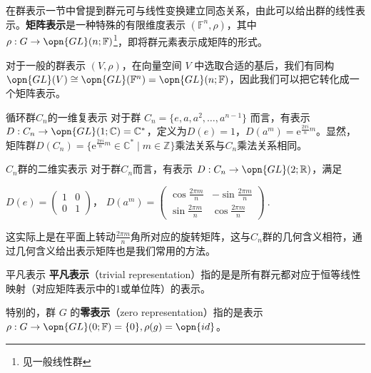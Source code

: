

在群表示一节中曾提到群元可与线性变换建立同态关系，由此可以给出群的线性表示。\textbf{矩阵表示}是一种特殊的有限维度表示 $(\mathbb{F}^n, \rho)$，其中 $\rho: G \to \opn{GL}(n; \mathbb{F})$\footnote{见一般线性群}，即将群元素表示成矩阵的形式。

对于一般的群表示 $(V, \rho)$，在向量空间 $V$ 中选取合适的基后，我们有同构 $\opn{GL}(V) \cong \opn{GL}(\mathbb{F}^n) = \opn{GL}(n; \mathbb{F})$，因此我们可以把它转化成一个矩阵表示。

\begin{example}{循环群$C_n$的一维复表示}\label{ex_gprep_1}
对于群 $C_n = \{e, a, a^2, \dots, a^{n - 1}\}$ 而言，有表示 $D: C_n \to \opn{GL}(1; \mathbb{C}) = \mathbb{C}^*$，定义为$D(e)=1$，$D(a^m) = \mathrm{e}^{\frac{2\pi i}{n}m}$。显然，矩阵群$D(C_n) = \{\mathrm{e}^{\frac{2\pi i}{n}m} \in \mathbb{C}^* \mid m \in \mathbb{Z}\}$乘法关系与$C_n$乘法关系相同。
\end{example}

\begin{example}{$C_n$群的二维实表示}\label{ex_gprep_2}
对于群$C_n$而言，有表示 $D: C_n \to \opn{GL}(2; \mathbb{R})$，满足

$D(e)=\begin{pmatrix}
 1 & 0 \\
 0 & 1
\end{pmatrix}$，
$D(a^m)=\begin{pmatrix}
 \cos{\frac{2\pi m}{n}} & -\sin{\frac{2\pi m}{n}}\\
 \sin{\frac{2\pi m}{n}} &\cos{\frac{2\pi m}{n}}
\end{pmatrix}~.$

这实际上是在平面上转动$\frac{2\pi m}{n}$角所对应的旋转矩阵，这与$C_n$群的几何含义相符，通过几何含义给出表示矩阵也是我们常用的方法。
\end{example}

\begin{definition}{平凡表示}
\textbf{平凡表示}（trivial representation）指的是是所有群元都对应于恒等线性映射（对应矩阵表示中的1或单位阵）的表示。

特别的，群 $G$ 的\textbf{零表示}（zero representation）指的是表示 $\rho: G \to \opn{GL}(0; \mathbb{F}) = \{0\}, \rho(g) = \opn{id}$。
\end{definition}

